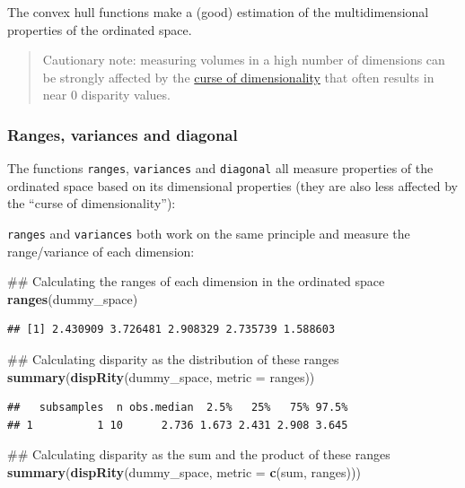 \documentclass[]{book}
\newenvironment{Shaded}{\begin{snugshade}}{\end{snugshade}}
\newcommand{\KeywordTok}[1]{\textcolor[rgb]{0.13,0.29,0.53}{\textbf{#1}}}
\newcommand{\DataTypeTok}[1]{\textcolor[rgb]{0.13,0.29,0.53}{#1}}
\newcommand{\NormalTok}[1]{#1}
\theoremstyle{definition}
\theoremstyle{definition}
\theoremstyle{remark}
\begin{document}
The convex hull functions make a (good) estimation of the
multidimensional properties of the ordinated space.

\begin{quote}
Cautionary note: measuring volumes in a high number of dimensions can be
strongly affected by the
\href{https://en.wikipedia.org/wiki/Curse_of_dimensionality}{curse of
dimensionality} that often results in near 0 disparity values.
\end{quote}

\subsubsection{Ranges, variances and
diagonal}\label{ranges-variances-and-diagonal}

The functions \texttt{ranges}, \texttt{variances} and \texttt{diagonal}
all measure properties of the ordinated space based on its dimensional
properties (they are also less affected by the ``curse of
dimensionality''):

\texttt{ranges} and \texttt{variances} both work on the same principle
and measure the range/variance of each dimension:

\begin{Shaded}
\begin{Highlighting}[]
\NormalTok{## Calculating the ranges of each dimension in the ordinated space}
\KeywordTok{ranges}\NormalTok{(dummy_space)}
\end{Highlighting}
\end{Shaded}

\begin{verbatim}
## [1] 2.430909 3.726481 2.908329 2.735739 1.588603
\end{verbatim}

\begin{Shaded}
\begin{Highlighting}[]
\NormalTok{## Calculating disparity as the distribution of these ranges}
\KeywordTok{summary}\NormalTok{(}\KeywordTok{dispRity}\NormalTok{(dummy_space, }\DataTypeTok{metric =}\NormalTok{ ranges))}
\end{Highlighting}
\end{Shaded}

\begin{verbatim}
##   subsamples  n obs.median  2.5%   25%   75% 97.5%
## 1          1 10      2.736 1.673 2.431 2.908 3.645
\end{verbatim}

\begin{Shaded}
\begin{Highlighting}[]
\NormalTok{## Calculating disparity as the sum and the product of these ranges}
\KeywordTok{summary}\NormalTok{(}\KeywordTok{dispRity}\NormalTok{(dummy_space, }\DataTypeTok{metric =} \KeywordTok{c}\NormalTok{(sum, ranges)))}
\end{Highlighting}
\end{Shaded}
\end{document}
